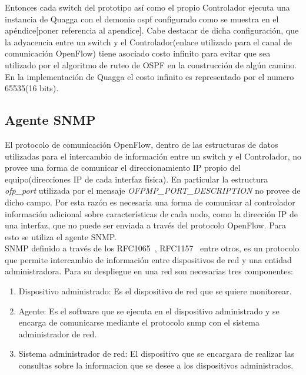 Entonces cada switch del prototipo así como el propio Controlador ejecuta una instancia de Quagga con el demonio ospf configurado como se muestra en el apéndice[poner referencia al apendice]. Cabe destacar de dicha configuración, que la adyacencia entre un switch y el Controlador(enlace utilizado para el canal de comunicación OpenFlow) tiene asociado costo infinito para evitar que sea utilizado por el algoritmo de ruteo de OSPF en la construcción de algún camino. En la implementaci\'on de Quagga el costo infinito es representado por el numero 65535(16 bits).

\subsection{Agente SNMP}
El protocolo de comunicación OpenFlow, dentro de las estructuras de datos utilizadas para el intercambio de información entre un switch y el Controlador, no provee una forma de comunicar el direccionamiento IP propio del equipo(direcciones IP de cada interfaz física). En particular la estructura \textit{ofp\_port} utilizada por el mensaje \textit{OFPMP\_PORT\_DESCRIPTION} no provee de dicho campo\citep{ofv133spec}. Por esta razón es necesaria una forma de comunicar al controlador información adicional sobre características de cada nodo, como la dirección IP de una interfaz, que no puede ser enviada a través del protocolo OpenFlow. Para esto se utiliza el agente SNMP.\\

SNMP definido a través de los RFC1065~\citep{rose1990structure}, RFC1157~\citep{case1989simple} entre otros, es un protocolo que permite intercambio de información entre dispositivos de red y una entidad administradora. Para su despliegue en una red son necesarias tres componentes: 

\begin{enumerate}

\item Dispositivo administrado: Es el dispositivo de red que se quiere monitorear.

\item Agente: Es el software que se ejecuta en el dispositivo administrado y se encarga de comunicarse mediante el protocolo snmp con el sistema administrador de red.

\item Sistema administrador de red: El dispositivo que se encargara de realizar las consultas sobre la informacion que se desee a los dispositivos administrados.

\end{enumerate}	

